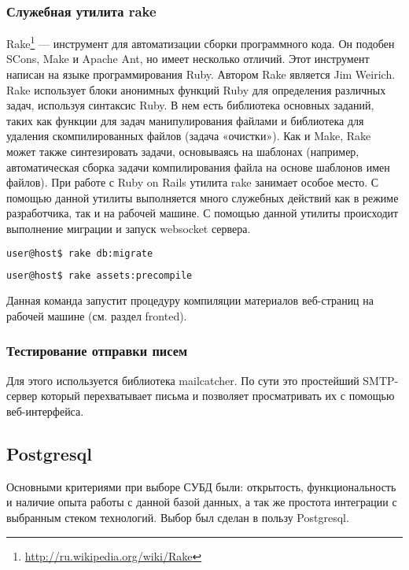 \subsubsection{Служебная утилита rake}
Rake\footnote{
	\url{http://ru.wikipedia.org/wiki/Rake}
} — инструмент для автоматизации сборки программного кода. Он подобен
SCons, Make и Apache Ant, но имеет несколько отличий. Этот инструмент написан на языке
программирования Ruby. Автором Rake является Jim Weirich.
Rake использует блоки анонимных функций Ruby для определения различных задач,
используя синтаксис Ruby. В нем есть библиотека основных заданий, таких как
функции для задач манипулирования файлами и библиотека для удаления
скомпилированных файлов (задача «очистки»). Как и Make, Rake может также
синтезировать задачи, основываясь на шаблонах (например, автоматическая сборка
задачи компилирования файла на основе шаблонов имен файлов).
При работе с Ruby on Rails утилита rake занимает особое место. С помощью данной
утилиты выполняется много служебных действий как в режиме разработчика, так и на
рабочей машине. С помощью данной утилиты происходит выполнение миграции и запуск
websocket сервера.

\begin{lstlisting}[language=Bash,caption=Выполнение миграций
,label={lst:rails_new_application}] 
user@host$ rake db:migrate
\end{lstlisting}

\begin{lstlisting}[language=Bash,caption=Компиляция ресурсов
,label={lst:rails_new_application}] 
user@host$ rake assets:precompile
\end{lstlisting}
 
 Данная команда запустит процедуру компиляции материалов веб-страниц на рабочей
 машине (см. раздел fronted).
 
 \subsubsection{Тестирование отправки писем}
 Для этого используется библиотека mailcatcher. По сути это простейший
 SMTP-сервер который перехватывает письма и позволяет просматривать их с помощью
 веб-интерфейса.
 
 \subsection{Postgresql}
Основными критериями при выборе СУБД были: открытость, функциональность и
наличие опыта работы с данной базой данных, а так же простота интеграции с
выбранным стеком технологий. Выбор был сделан в пользу Postgresql.

